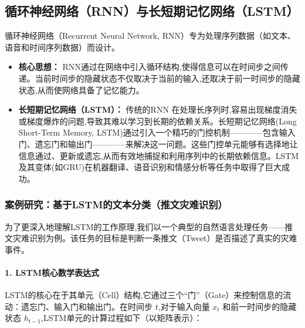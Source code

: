 \subsection{循环神经网络（RNN）与长短期记忆网络（LSTM）}
\label{ssec:rnn_lstm}
循环神经网络（Recurrent Neural Network, RNN）专为处理序列数据（如文本、语音和时间序列数据）而设计。
\begin{itemize}
    \item \textbf{核心思想：} RNN通过在网络中引入循环结构,使得信息可以在时间步之间传递。当前时间步的隐藏状态不仅取决于当前的输入,还取决于前一时间步的隐藏状态,从而使网络具备了记忆能力。
    \item \textbf{长短期记忆网络（LSTM）：} 传统的RNN 在处理长序列时,容易出现梯度消失或梯度爆炸的问题,导致其难以学习到长期的依赖关系。长短期记忆网络(Long Short-Term Memory, LSTM)通过引入一个精巧的门控机制————包含输入门、遗忘门和输出门————来解决这一问题。这些门控单元能够有选择地让信息通过、更新或遗忘,从而有效地捕捉和利用序列中的长期依赖信息。LSTM及其变体(如GRU)在机器翻译、语音识别和情感分析等任务中取得了巨大成功。
\end{itemize}

\subsubsection*{案例研究：基于LSTM的文本分类（推文灾难识别）}
\label{sssec:lstm_case_study}
为了更深入地理解LSTM的工作原理,我们以一个典型的自然语言处理任务——推文灾难识别为例。该任务的目标是判断一条推文（Tweet）是否描述了真实的灾难事件。

\paragraph{1. LSTM核心数学表达式}
LSTM的核心在于其单元（Cell）结构,它通过三个“门”（Gate）来控制信息的流动：遗忘门、输入门和输出门。在时间步 $t$,对于输入向量 $x_t$ 和前一时间步的隐藏状态 $h_{t-1}$,LSTM单元的计算过程如下（以矩阵表示）：

